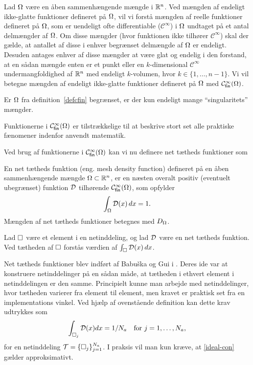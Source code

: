 \begin{definition} \label{defcfin}
Lad $\Omega$ være en åben sammenhængende mængde i $\mathbb{R}^n$. Ved mængden af
endeligt ikke-glatte funktioner defineret på $\Omega$, vil vi forstå
mængden af reelle funktioner defineret på $\Omega$, som er uendeligt ofte
differentiable (${\mathcal C}^\infty$) i $\Omega$ undtaget på et antal
delmængder af $\Omega$. Om disse mængder (hvor funktionen ikke tilhører
${\mathcal C}^\infty$) skal der gælde, at antallet af disse i enhver
begrænset delmængde af $\Omega$ er endeligt. Desuden antages enhver af
disse mængder at være glat og endelig i den forstand, at en sådan
mængde enten er et punkt eller en $k$-dimensional ${\mathcal
C}^\infty$ undermangfoldighed af $\mathbb{R}^n$ med endeligt $k$-volumen, hvor
$k\in\{ 1,\ldots ,n-1\}$. Vi vil betegne mængden af endeligt
ikke-glatte funktioner defineret på $\Omega$ med ${\mathcal{C}}^{\infty}_{\mathsf{fin}}(\Omega)$.
\end{definition}
\begin{remark}
Er $\Omega$ fra definition~\ref{defcfin} begrænset, er der kun endeligt
mange ``singularitets'' mængder.
\end{remark}
\begin{remark}
Funktionerne i ${\mathcal{C}}^{\infty}_{\mathsf{fin}}(\Omega)$ er tilstrækkelige til at beskrive stort set
alle praktiske fænomener indenfor anvendt matematik.
\end{remark}
Ved brug af funktionerne i ${\mathcal{C}}^{\infty}_{\mathsf{fin}}(\Omega)$ kan vi nu definere net tætheds
funktioner som
\begin{definition}  \label{density}
En net tætheds funktion (eng. mesh density function) defineret på
en åben sammenhængende mængde $\Omega\subset\mathbb{R}^n$, er en næsten overalt
positiv (eventuelt ubegrænset) funktion ${\mathcal{D}}$ tilhørende ${\mathcal{C}}^{\infty}_{\mathsf{fin}}(\Omega)$, som opfylder
\begin{equation}
  \int_{\Omega} {\mathcal{D}}(x)\, dx = 1.
\end{equation}
Mængden af net tætheds funktioner betegnes med $D_{\Omega}$.
\end{definition}
\begin{definition}
Lad $\Box$ være et element i en netinddeling, og lad ${\mathcal{D}}$ være en net
tætheds funktion. Ved tætheden af $\Box$ forstås værdien af 
$\int_\Box {\mathcal{D}} (x)\, dx$.
\end{definition}
Net tætheds funktioner blev indført af Babu\v{s}ka og Gui i
\cite{ba-gui}. Deres ide var at konstruere netinddelinger på en sådan måde,
at tætheden i ethvert element i netinddeling\-en er den samme.
Principielt kunne man arbejde med netinddelinger, hvor tætheden varierer
fra element til element, men kravet er praktisk set fra en
implementations vinkel. Ved hjælp af ovenstående definition kan dette
krav udtrykkes som
\begin{equation} \label{ideal-con}
  \int_{\Box_j} {\mathcal{D}} (x)dx = 1/N_a \quad \text{for $j=1,\ldots,N_a$,}
\end{equation} 
for en netinddeling $\mathcal T=\{\Box_j\}_{j=1}^{N_a}$. I praksis vil man kun 
kræve, at \eqref{ideal-con} gælder approksimativt.

